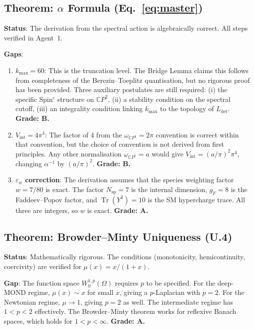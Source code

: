 \documentclass[11pt,a4paper]{article}
\newcommand{\Tr}{\operatorname{Tr}}
\newcommand{\CP}{\mathbb{C}P}
\begin{document}
\subsection{Theorem: $\alpha$ Formula (Eq.~\ref{eq:master})}

\textbf{Status}: The derivation from the spectral action is algebraically correct. All steps verified in Agent~1.

\textbf{Gaps}:
\begin{enumerate}
\item \textbf{$k_{\max} = 60$}: This is the truncation level. The Bridge Lemma claims this follows from completeness of the Berezin--Toeplitz quantisation, but no rigorous proof has been provided. Three auxiliary postulates are still required: (i) the specific Spin$^c$ structure on $\CP^2$, (ii) a stability condition on the spectral cutoff, (iii) an integrality condition linking $k_{\max}$ to the topology of $L_{\det}$. \textbf{Grade: B.}

\item \textbf{$V_{\mathrm{int}} = 4\pi^4$}: The factor of 4 from the $\omega_{\CP^1} = 2\pi$ convention is correct within that convention, but the choice of convention is not derived from first principles. Any other normalisation $\omega_{\CP^1} = a$ would give $V_{\mathrm{int}} = (a/\pi)^2 \pi^4$, changing $\alpha^{-1}$ by $(a/\pi)^2$. \textbf{Grade: B.}

\item \textbf{$\varepsilon_w$ correction}: The derivation assumes that the species weighting factor $w = 7/80$ is exact. The factor $N_{\mathrm{sp}} = 7$ is the internal dimension, $g_F = 8$ is the Faddeev--Popov factor, and $\Tr(Y^2) = 10$ is the SM hypercharge trace. All three are integers, so $w$ is exact. \textbf{Grade: A.}
\end{enumerate}

\subsection{Theorem: Browder--Minty Uniqueness (U.4)}

\textbf{Status}: Mathematically rigorous. The conditions (monotonicity, hemicontinuity, coercivity) are verified for $\mu(x) = x/(1+x)$.

\textbf{Gap}: The function space $W^{1,p}_0(\Omega)$ requires $p$ to be specified. For the deep-MOND regime, $\mu(x) \sim x$ for small $x$, giving a $p$-Laplacian with $p = 2$. For the Newtonian regime, $\mu \to 1$, giving $p = 2$ as well. The intermediate regime has $1 < p < 2$ effectively. The Browder--Minty theorem works for reflexive Banach spaces, which holds for $1 < p < \infty$. \textbf{Grade: A.}
\end{document}
